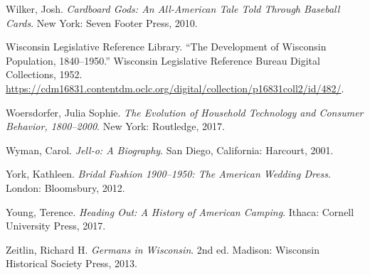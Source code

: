 \documentclass[
  american,
  letterpaper,
]{book}
\newlength{\cslhangindent}
\newenvironment{CSLReferences}[2] %
 {\begin{list}{}{%
  \setlength{\itemindent}{0pt}
  \setlength{\leftmargin}{0pt}
  \setlength{\parsep}{0pt}
  \ifodd #1
   \setlength{\leftmargin}{\cslhangindent}
   \setlength{\itemindent}{-1\cslhangindent}
  \fi
  \setlength{\itemsep}{#2\baselineskip}}}
 {\end{list}}
\begin{document}
\begin{CSLReferences}{1}{0}
Wilker, Josh. \emph{Cardboard Gods: An All-American Tale Told Through
Baseball Cards}. New York: Seven Footer Press, 2010.

Wisconsin Legislative Reference Library. {``The Development of Wisconsin
Population, 1840--1950.''} Wisconsin Legislative Reference Bureau
Digital Collections, 1952.
\url{https://cdm16831.contentdm.oclc.org/digital/collection/p16831coll2/id/482/}.

Woersdorfer, Julia Sophie. \emph{The Evolution of Household Technology
and Consumer Behavior, 1800--2000}. New York: Routledge, 2017.

Wyman, Carol. \emph{Jell-o: A Biography}. San Diego, California:
Harcourt, 2001.

York, Kathleen. \emph{Bridal Fashion 1900--1950: The American Wedding
Dress}. London: Bloomsbury, 2012.

Young, Terence. \emph{Heading Out: A History of American Camping}.
Ithaca: Cornell University Press, 2017.

Zeitlin, Richard H. \emph{Germans in Wisconsin}. 2nd ed. Madison:
Wisconsin Historical Society Press, 2013.

\end{CSLReferences}


\backmatter
\end{document}
